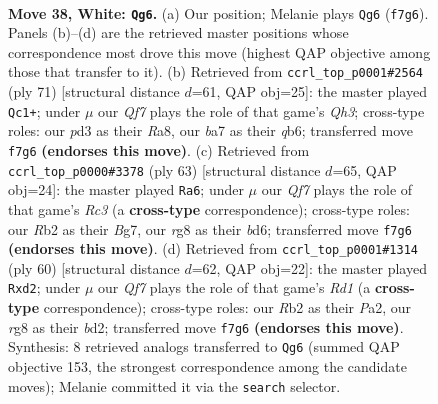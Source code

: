 \documentclass[11pt]{article}
\begin{document}
\clearpage

\begin{figure}[p]\centering
\begin{subfigure}{0.46\textwidth}\centering
\resizebox{\linewidth}{!}{%
\newchessgame
\chessboard[
  setfen={r5rk/bp1b1Q2/p3p2p/8/8/BP1p3q/PR3P1P/4R1K1 w - - 4 38},
  showmover=false,
  pgfstyle=straightmove, color=movearrow, markmove={f7-g6}
]}
\caption{}
\end{subfigure}\hfill
\begin{subfigure}{0.46\textwidth}\centering
\resizebox{\linewidth}{!}{%
\newchessgame
\chessboard[
  setfen={r3r2k/6Rp/1Q2p2q/p2pP3/3P4/3b2R1/PP3PB1/6K1 b - - 8 36},
  showmover=false,
  pgfstyle=straightmove, color=movearrow, markmove={h6-c1}
]}
\caption{}
\end{subfigure}
\\[4pt]
\begin{subfigure}{0.46\textwidth}\centering
\resizebox{\linewidth}{!}{%
\newchessgame
\chessboard[
  setfen={4r1k1/5pbp/2rB2p1/3Rp1P1/7q/5P2/1PPQ4/1K2R3 b - - 1 32},
  showmover=false,
  pgfstyle=straightmove, color=movearrow, markmove={c6-a6}
]}
\caption{}
\end{subfigure}\hfill
\begin{subfigure}{0.46\textwidth}\centering
\resizebox{\linewidth}{!}{%
\newchessgame
\chessboard[
  setfen={2r3rk/1p5p/8/p2q4/5P2/3pP2Q/P2b2PP/3R1R1K w - - 0 31},
  showmover=false,
  pgfstyle=straightmove, color=movearrow, markmove={d1-d2}
]}
\caption{}
\end{subfigure}
\caption{\textbf{Move 38, White: \texttt{Qg6}.} (a) Our position; Melanie plays \texttt{Qg6} (\texttt{f7g6}). Panels (b)--(d) are the retrieved master positions whose correspondence most drove this move (highest QAP objective among those that transfer to it). (b) Retrieved from \texttt{ccrl\_top\_p0001\#2564} (ply 71) [structural distance $d$=61, QAP obj=25]: the master played \texttt{Qc1+}; under $\mu$ our \emph{Qf7} plays the role of that game's \emph{Qh3}; cross-type roles: our \emph{p}d3 as their \emph{R}a8, our \emph{b}a7 as their \emph{q}b6; transferred move \texttt{f7g6} \textbf{(endorses this move)}. (c) Retrieved from \texttt{ccrl\_top\_p0000\#3378} (ply 63) [structural distance $d$=65, QAP obj=24]: the master played \texttt{Ra6}; under $\mu$ our \emph{Qf7} plays the role of that game's \emph{Rc3} (a \textbf{cross-type} correspondence); cross-type roles: our \emph{R}b2 as their \emph{B}g7, our \emph{r}g8 as their \emph{b}d6; transferred move \texttt{f7g6} \textbf{(endorses this move)}. (d) Retrieved from \texttt{ccrl\_top\_p0001\#1314} (ply 60) [structural distance $d$=62, QAP obj=22]: the master played \texttt{Rxd2}; under $\mu$ our \emph{Qf7} plays the role of that game's \emph{Rd1} (a \textbf{cross-type} correspondence); cross-type roles: our \emph{R}b2 as their \emph{P}a2, our \emph{r}g8 as their \emph{b}d2; transferred move \texttt{f7g6} \textbf{(endorses this move)}. Synthesis: 8 retrieved analogs transferred to \texttt{Qg6} (summed QAP objective 153, the strongest correspondence among the candidate moves); Melanie committed it via the \texttt{search} selector.}
\label{fig:thought-m74}
\end{figure}
\end{document}
